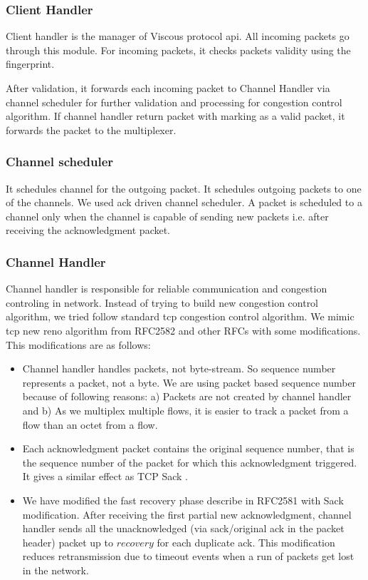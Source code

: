\subsubsection{Client Handler}
Client handler is the manager of Viscous protocol \acrshort{api}. All incoming packets go through this module. For incoming packets, it checks packets validity using the fingerprint. 

After validation, it forwards each incoming packet to Channel Handler via channel scheduler for further validation and processing for congestion control algorithm. If channel handler return packet with marking as a valid packet, it forwards the packet to the multiplexer.

\subsubsection{Channel scheduler}
It schedules channel for the outgoing packet. It schedules outgoing packets to one of the channels. We used ack driven channel scheduler. A packet is scheduled to a channel only when the channel is capable of sending new packets i.e. after receiving the acknowledgment packet. 

\subsubsection{Channel Handler}
Channel handler is responsible for reliable communication and congestion controling in network. Instead of trying to build new congestion control algorithm, we tried follow standard \acrshort{tcp}\cite{RFC2582} congestion control algorithm. We mimic tcp new reno algorithm from RFC2582\cite{RFC2582} and other RFCs\cite{RFC2581,RFC2988,RFC2001,RFC0793} with some modifications. This modifications are as follows:
\begin{itemize}
    \item Channel handler handles packets, not byte-stream. So sequence number represents a packet, not a byte. We are using packet based sequence number because of following reasons: a) Packets are not created by channel handler and b) As we multiplex multiple flows, it is easier to track a packet from a flow than an octet from a flow.
    \item Each acknowledgment packet contains the original sequence number, that is the sequence number of the packet for which this acknowledgment triggered. It gives a similar effect as TCP Sack \cite{RFC2018}.
    \item We have modified the fast recovery phase describe in RFC2581\cite{RFC2582} with Sack modification. After receiving the first partial new acknowledgment, channel handler sends all the unacknowledged (via sack/original ack in the packet header) packet up to $recovery$ for each duplicate ack. This modification reduces retransmission due to timeout events when a run of packets get lost in the network.
\end{itemize}

